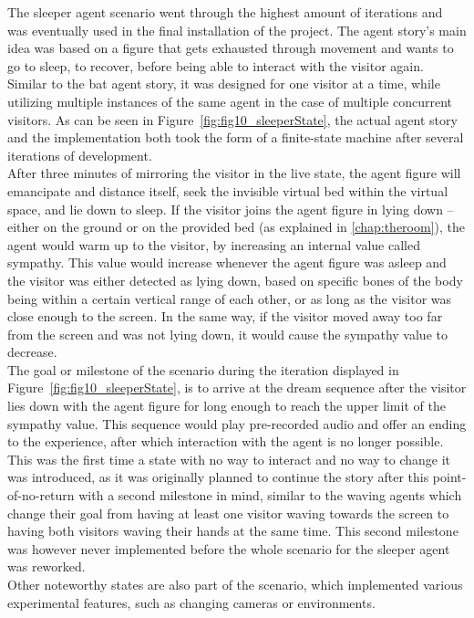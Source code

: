 \documentclass[draft,final]{vutinfth} %
\begin{document}
The sleeper agent scenario went through the highest amount of iterations and was eventually used in the final installation of the project. 
The agent story’s main idea was based on a figure that gets exhausted through movement and wants to go to sleep, to recover, before being able to interact with the visitor again. 
Similar to the bat agent story, it was designed for one visitor at a time, while utilizing multiple instances of the same agent in the case of multiple concurrent visitors. 
As can be seen in Figure~\ref{fig:fig10_sleeperState}, the actual agent story and the implementation both took the form of a finite-state machine after several iterations of development. \\
After three minutes of mirroring the visitor in the live state, the agent figure will emancipate and distance itself, seek the invisible virtual bed within the virtual space, and lie down to sleep. 
If the visitor joins the agent figure in lying down – either on the ground or on the provided bed (as explained in \autoref{chap:theroom}), the agent would warm up to the visitor, by increasing an internal value called sympathy. 
This value would increase whenever the agent figure was asleep and the visitor was either detected as lying down, based on specific bones of the body being within a certain vertical range of each other, or as long as the visitor was close enough to the screen. 
In the same way, if the visitor moved away too far from the screen and was not lying down, it would cause the sympathy value to decrease. \\
The goal or milestone of the scenario during the iteration displayed in Figure~\ref{fig:fig10_sleeperState}, is to arrive at the dream sequence after the visitor lies down with the agent figure for long enough to reach the upper limit of the sympathy value. 
This sequence would play pre-recorded audio and offer an ending to the experience, after which interaction with the agent is no longer possible. 
This was the first time a state with no way to interact and no way to change it was introduced, as it was originally planned to continue the story after this point-of-no-return with a second milestone in mind, similar to the waving agents which change their goal from having at least one visitor waving towards the screen to having both visitors waving their hands at the same time. 
This second milestone was however never implemented before the whole scenario for the sleeper agent was reworked. \\
Other noteworthy states are also part of the scenario, which implemented various experimental features, such as changing cameras or environments. 
\end{document}
